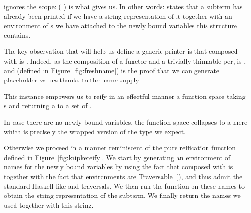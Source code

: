 ignores the scope: ({ \AF{++} }) is what  gives us.
%
In other words:  states that a subterm has already been printed
if we have a string representation of it together with an environment of
s we have attached to the newly bound variables this structure
contains.
%
\begin{agdasnippet}
\end{agdasnippet}
%
The key observation that will help us define a generic printer is that
 composed with  is . Indeed, as the
composition of a functor and a trivially thinnable per,
 is , and  (defined in
Figure~\ref{fig:freshname}) is the proof that we can generate
placeholder values thanks to the name supply.

\begin{agdasnippet}
\end{agdasnippet}

This  instance empowers us to reify in an effectful manner
a  function space taking s and returning a 
to a set of .

\begin{agdasnippet}
\end{agdasnippet}

In case there are no newly bound variables, the  function space
collapses to a mere  which is precisely the wrapped version of
the type we expect.

\begin{agdasnippet}
\end{agdasnippet}

Otherwise we proceed in a manner reminiscent of the pure reification function
defined in Figure~\ref{fig:kripkereify}. We start by generating an environment
of names for the newly bound variables by using the fact that  composed
with  is  together with the fact that environments are
Traversable~(\cite{mcbride_paterson_2008}), %
and thus admit the standard Haskell-like  and 
traversals. %
We then run the  function
on these names to obtain the string representation of the subterm. We finally
return the names we used together with this string.

